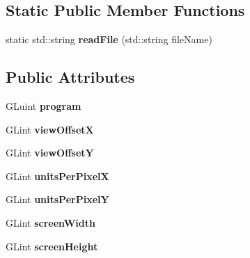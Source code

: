 \subsection*{Static Public Member Functions}
\begin{DoxyCompactItemize}
\item 
\hypertarget{classShaderProgram_ab0705c01246e6a70e8c3bc278666b2d0}{}static std\+::string {\bfseries read\+File} (std\+::string file\+Name)\label{classShaderProgram_ab0705c01246e6a70e8c3bc278666b2d0}

\end{DoxyCompactItemize}
\subsection*{Public Attributes}
\begin{DoxyCompactItemize}
\item 
\hypertarget{classShaderProgram_a5cd33e7bf1c9d23b2eef8aa93dc36558}{}G\+Luint {\bfseries program}\label{classShaderProgram_a5cd33e7bf1c9d23b2eef8aa93dc36558}

\item 
\hypertarget{classShaderProgram_ad9000af8292a5de7a33108ae6c775acd}{}G\+Lint {\bfseries view\+Offset\+X}\label{classShaderProgram_ad9000af8292a5de7a33108ae6c775acd}

\item 
\hypertarget{classShaderProgram_a5f68b35bbd45e69c2b53310cc5f6d73f}{}G\+Lint {\bfseries view\+Offset\+Y}\label{classShaderProgram_a5f68b35bbd45e69c2b53310cc5f6d73f}

\item 
\hypertarget{classShaderProgram_ab228e6feb1db07d20255c6bde5ed33a8}{}G\+Lint {\bfseries units\+Per\+Pixel\+X}\label{classShaderProgram_ab228e6feb1db07d20255c6bde5ed33a8}

\item 
\hypertarget{classShaderProgram_addaecff211bcb14fe9f254c31f407327}{}G\+Lint {\bfseries units\+Per\+Pixel\+Y}\label{classShaderProgram_addaecff211bcb14fe9f254c31f407327}

\item 
\hypertarget{classShaderProgram_ac9dc87f9ae304100c66a86f59c6ddc63}{}G\+Lint {\bfseries screen\+Width}\label{classShaderProgram_ac9dc87f9ae304100c66a86f59c6ddc63}

\item 
\hypertarget{classShaderProgram_adf3cf91290d9ccdc9a07a88dffaf8bcb}{}G\+Lint {\bfseries screen\+Height}\label{classShaderProgram_adf3cf91290d9ccdc9a07a88dffaf8bcb}

\end{DoxyCompactItemize}


